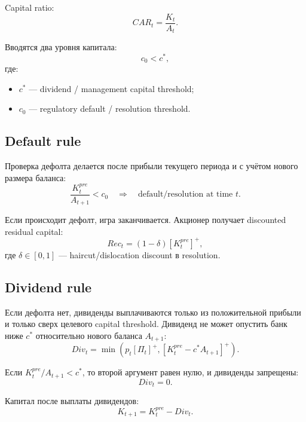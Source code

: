 \documentclass[11pt,a4paper]{article}
\newcommand{\1}{\mathbf{1}}
\newcommand{\pos}[1]{\left[#1\right]^+}
\begin{document}
Capital ratio:
\begin{equation}
    CAR_t = \frac{K_t}{A_t}.
\end{equation}

Вводятся два уровня капитала:
\begin{equation}
    c_0 < c^*,
\end{equation}
где:
\begin{itemize}[noitemsep]
    \item $c^*$ --- dividend / management capital threshold;
    \item $c_0$ --- regulatory default / resolution threshold.
\end{itemize}

\subsection{Default rule}

Проверка дефолта делается после прибыли текущего периода и с учётом нового размера баланса:
\begin{equation}
    \frac{K_t^{pre}}{A_{t+1}} < c_0
    \quad\Rightarrow\quad
    \text{default/resolution at time } t.
\end{equation}

Если происходит дефолт, игра заканчивается. Акционер получает discounted residual capital:
\begin{equation}
    Rec_t = (1-\delta)\pos{K_t^{pre}},
\end{equation}
где $\delta\in[0,1]$ --- haircut/dislocation discount в resolution.

\subsection{Dividend rule}

Если дефолта нет, дивиденды выплачиваются только из положительной прибыли и только сверх целевого capital threshold. Дивиденд не может опустить банк ниже $c^*$ относительно нового баланса $A_{t+1}$:
\begin{equation}
    Div_t
    =
    \min\left(
        p_t\pos{\Pi_t},
        \pos{K_t^{pre}-c^*A_{t+1}}
    \right).
\end{equation}

Если $K_t^{pre}/A_{t+1}<c^*$, то второй аргумент равен нулю, и дивиденды запрещены:
\begin{equation}
    Div_t=0.
\end{equation}

Капитал после выплаты дивидендов:
\begin{equation}
    K_{t+1}=K_t^{pre}-Div_t.
\end{equation}
\end{document}
